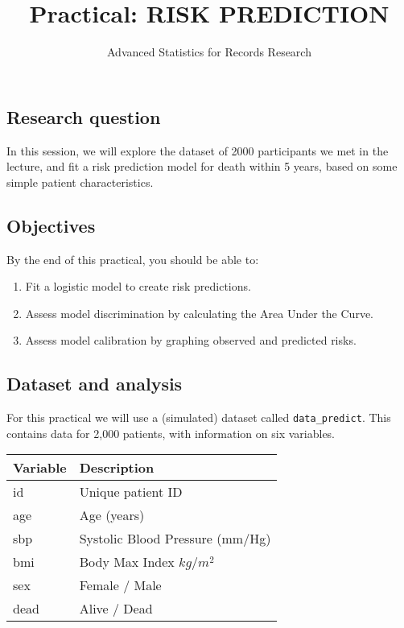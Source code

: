 \documentclass[
]{article}
\title{Practical: RISK PREDICTION}
\subtitle{Advanced Statistics for Records Research}
\author{}
\date{\vspace{-2.5em}}
\begin{document}
\maketitle

\hypertarget{research-question}{%
\subsection{Research question}\label{research-question}}

In this session, we will explore the dataset of 2000 participants we met
in the lecture, and fit a risk prediction model for death within 5
years, based on some simple patient characteristics.

\hypertarget{objectives}{%
\subsection{Objectives}\label{objectives}}

By the end of this practical, you should be able to:

\begin{enumerate}
\def\labelenumi{\arabic{enumi}.}
\item
  Fit a logistic model to create risk predictions.
\item
  Assess model discrimination by calculating the Area Under the Curve.
\item
  Assess model calibration by graphing observed and predicted risks.
\end{enumerate}

\hypertarget{dataset-and-analysis}{%
\subsection{Dataset and analysis}\label{dataset-and-analysis}}

For this practical we will use a (simulated) dataset called
\texttt{data\_predict}. This contains data for 2,000 patients, with
information on six variables.

\begin{longtable}[]{@{}ll@{}}
\toprule()
Variable & Description \\
\midrule()
\endhead
id & Unique patient ID \\
age & Age (years) \\
sbp & Systolic Blood Pressure (mm/Hg) \\
bmi & Body Max Index \(kg/m^2\) \\
sex & Female / Male \\
dead & Alive / Dead \\
\bottomrule()
\end{longtable}
\end{document}
